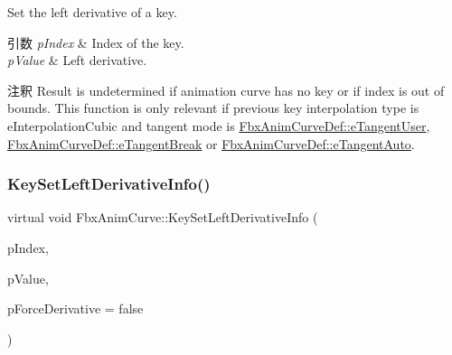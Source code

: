 Set the left derivative of a key. 
\begin{DoxyParams}{引数}
{\em p\+Index} & Index of the key. \\
\hline
{\em p\+Value} & Left derivative. \\
\hline
\end{DoxyParams}
\begin{DoxyRemark}{注釈}
Result is undetermined if animation curve has no key or if index is out of bounds. This function is only relevant if previous key interpolation type is e\+Interpolation\+Cubic and tangent mode is \hyperlink{class_fbx_anim_curve_def_ac810ccc5ca0527704ab5175479964b87a199cb16b2c861b12c334093ce796cb86}{Fbx\+Anim\+Curve\+Def\+::e\+Tangent\+User}, \hyperlink{class_fbx_anim_curve_def_ac810ccc5ca0527704ab5175479964b87ab4d85a1a0474226be85b885518f6c847}{Fbx\+Anim\+Curve\+Def\+::e\+Tangent\+Break} or \hyperlink{class_fbx_anim_curve_def_ac810ccc5ca0527704ab5175479964b87a56e3bad364851277281e94e81327dd25}{Fbx\+Anim\+Curve\+Def\+::e\+Tangent\+Auto}. 
\end{DoxyRemark}
\mbox{\label{class_fbx_anim_curve_a8fa694edd4fb27b9b61739efa9e27083}} 
\subsubsection{\texorpdfstring{Key\+Set\+Left\+Derivative\+Info()}{KeySetLeftDerivativeInfo()}}
{\footnotesize\ttfamily virtual void Fbx\+Anim\+Curve\+::\+Key\+Set\+Left\+Derivative\+Info (\begin{DoxyParamCaption}\item[{int}]{p\+Index,  }\item[{const \hyperlink{struct_fbx_anim_curve_tangent_info}{Fbx\+Anim\+Curve\+Tangent\+Info} \&}]{p\+Value,  }\item[{bool}]{p\+Force\+Derivative = {\ttfamily false} }\end{DoxyParamCaption})\hspace{0.3cm}{\ttfamily [pure virtual]}}

